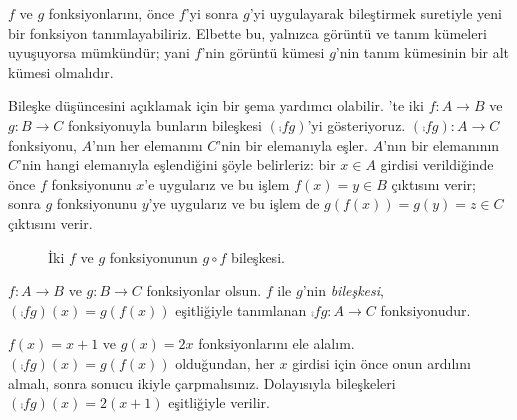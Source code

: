 


\begin{explain}
$f$ ve $g$
fonksiyonlarını, önce $f$'yi sonra $g$'yi uygulayarak bileştirmek suretiyle yeni
bir fonksiyon tanımlayabiliriz. Elbette bu, yalnızca görüntü ve tanım kümeleri
uyuşuyorsa mümkündür; yani $f$'nin görüntü kümesi $g$'nin tanım kümesinin bir
alt kümesi olmalıdır. 

Bileşke düşüncesini açıklamak için bir şema yardımcı olabilir.
'te iki $f \colon A \to B$ ve $g \colon B \to C$
fonksiyonuyla bunların bileşkesi $(\comp{f}{g})$'yi gösteriyoruz.
$(\comp{f}{g}) \colon A \to C$ fonksiyonu, $A$'nın her elemanını $C$'nin bir
elemanıyla eşler. $A$'nın bir elemanının $C$'nin hangi elemanıyla
eşlendiğini şöyle belirleriz: bir $x \in A$ girdisi verildiğinde önce $f$
fonksiyonunu $x$'e uygularız ve bu işlem $f(x)=y \in B$ çıktısını verir;
sonra $g$ fonksiyonunu $y$'ye uygularız ve bu işlem de
$g(f(x))=g(y)=z \in C$ çıktısını verir.
\begin{figure}
  \caption{İki $f$ ve $g$ fonksiyonunun $g \circ f$ bileşkesi.}
\end{figure}
\end{explain}

\begin{defn}[Bileşke]
$f\colon A \to B$ ve $g\colon B \to C$ fonksiyonlar olsun. $f$ ile $g$'nin
\emph{bileşkesi}, $(\comp{f}{g})(x)=g(f(x))$ eşitliğiyle tanımlanan
$\comp{f}{g} \colon A \to C$ fonksiyonudur.
\end{defn}

\begin{ex}
$f(x)=x+1$ ve $g(x)=2x$ fonksiyonlarını ele alalım.
$(\comp{f}{g})(x)=g(f(x))$ olduğundan, her $x$ girdisi için önce onun
ardılını almalı, sonra sonucu ikiyle çarpmalısınız. Dolayısıyla bileşkeleri
$(\comp{f}{g})(x)=2(x+1)$ eşitliğiyle verilir.
\end{ex}

